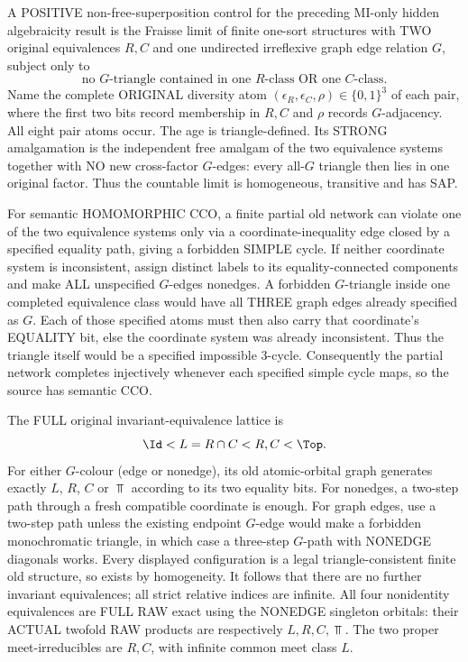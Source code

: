 \begin{example}
\label{ex:typed-graph-coupled-two-mi}
A POSITIVE non-free-superposition control for the
preceding MI-only hidden algebraicity result is
the Fraisse limit of finite one-sort structures
with TWO original equivalences $R,C$ and
one undirected irreflexive graph edge relation
$G$, subject only to
\[
 \text{no $G$-triangle contained in one
 $R$-class OR one $C$-class}.
\]
Name the complete ORIGINAL diversity atom
$(\epsilon_R,\epsilon_C,\rho)\in\{0,1\}^3$
of each pair, where the first two bits
record membership in $R,C$ and
$\rho$ records $G$-adjacency.
All eight pair atoms occur.
The age is triangle-defined.
Its STRONG amalgamation is the independent
free amalgam of the two equivalence
systems together with NO new cross-factor
$G$-edges: every all-$G$ triangle
then lies in one original factor.
Thus the countable limit is homogeneous,
transitive and has SAP.

For semantic HOMOMORPHIC CCO, a finite
partial old network can violate one
of the two equivalence systems only
via a coordinate-inequality edge
closed by a specified equality path,
giving a forbidden SIMPLE cycle.
If neither coordinate system is
inconsistent, assign distinct labels
to its equality-connected components
and make ALL unspecified $G$-edges
nonedges. A forbidden $G$-triangle
inside one completed equivalence
class would have all THREE graph
edges already specified as $G$.
Each of those specified atoms must
then also carry that coordinate's
EQUALITY bit, else the coordinate
system was already inconsistent.
Thus the triangle itself would be
a specified impossible 3-cycle.
Consequently the partial network
completes injectively whenever
each specified simple cycle maps,
so the source has semantic CCO.

The FULL original invariant-equivalence
lattice is
\[
                   \Id<L=R\cap C<R,C<\Top .
\]
For either $G$-colour (edge or nonedge),
its old atomic-orbital graph generates
exactly $L$, $R$, $C$ or $\Top$
according to its two equality bits.
For nonedges, a two-step path through
a fresh compatible coordinate is enough.
For graph edges, use a two-step path
unless the existing endpoint $G$-edge
would make a forbidden monochromatic
triangle, in which case a three-step
$G$-path with NONEDGE diagonals
works. Every displayed configuration
is a legal triangle-consistent finite
old structure, so exists by homogeneity.
It follows that there are no further
invariant equivalences; all strict
relative indices are infinite.
All four nonidentity equivalences
are FULL RAW exact using the
NONEDGE singleton orbitals:
their ACTUAL twofold RAW products
are respectively $L,R,C,\Top$.
The two proper meet-irreducibles
are $R,C$, with infinite common
meet class $L$.


\end{example}
